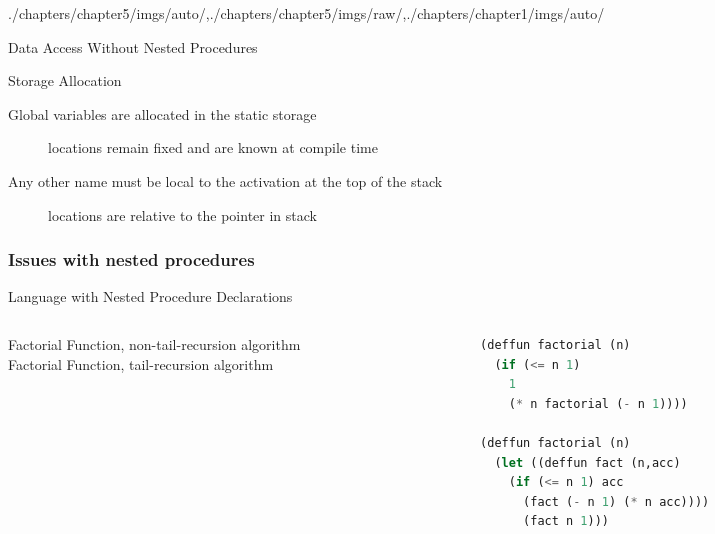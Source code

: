 \begin{graphicspathcontext}{{./chapters/chapter5/imgs/auto/},{./chapters/chapter5/imgs/raw/},{./chapters/chapter1/imgs/auto/}}
\begin{bibunit}[apalike]
\begin{frame}{{Data Access} Without Nested Procedures}
	\vspace{1cm}
	\begin{block}{Storage Allocation}
		\begin{description}
			\item[Global variables are allocated in the static storage] locations remain fixed and are known at compile time
			\item[Any other name must be local to the activation at the top of the stack] locations are relative to the  pointer in stack
		\end{description}		
	\end{block}
\end{frame}

\subsubsection{Issues with nested procedures}
\subsubsectiontableofcontentslide

\begin{frame}[background=6,fragile]{Language with Nested Procedure Declarations}
	\vspace{.5cm}
	\begin{columns}
		\begin{column}{.3\linewidth}
			Factorial Function, non-tail-recursion algorithm \\
			\vspace{3em}
			Factorial Function, tail-recursion algorithm
		\end{column}
		\begin{column}{.6\linewidth}
			\begin{lstlisting}[language=lisp,basicstyle=\footnotesize]
(deffun factorial (n)
  (if (<= n 1)
    1
    (* n factorial (- n 1))))

(deffun factorial (n)
  (let ((deffun fact (n,acc)
    (if (<= n 1) acc
      (fact (- n 1) (* n acc))))
      (fact n 1)))
			\end{lstlisting}
		\end{column}
	\end{columns}
\end{frame}


\end{bibunit}
\end{graphicspathcontext}
